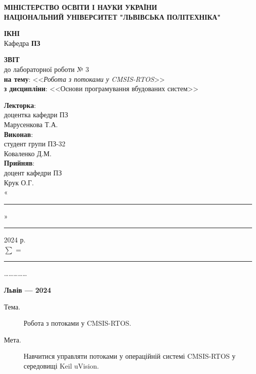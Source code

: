 \documentclass[oneside,14pt]{extarticle}
\newcommand\subject{Основи програмування вбудованих систем}
\newcommand\lecturer{доцентка кафедри ПЗ\\Марусенкова Т.А.}
\newcommand\teacher{доцент кафедри ПЗ\\Крук О.Г.}
\newcommand\mygroup{ПЗ-32}
\newcommand\lab{3}
\newcommand\theme{Робота з потоками у CMSIS-RTOS}
\newcommand\purpose{Навчитися управляти потоками у операційній системі CMSIS-RTOS у середовищі Keil uVision}
\begin{document}
\begin{normalsize}
	\begin{titlepage}
		\thispagestyle{empty}
		\begin{center}
			\textbf{МІНІСТЕРСТВО ОСВІТИ І НАУКИ УКРАЇНИ\\
				НАЦІОНАЛЬНИЙ УНІВЕРСИТЕТ "ЛЬВІВСЬКА ПОЛІТЕХНІКА"}
		\end{center}
		\begin{flushright}
			\textbf{ІКНІ}\\
			Кафедра \textbf{ПЗ}
		\end{flushright}
		\vspace{80pt}
		\begin{center}
			\textbf{ЗВІТ}\\
			\vspace{10pt}
			до лабораторної роботи № \lab\\
			\textbf{на тему}: <<\textit{\theme}>>\\
			\textbf{з дисципліни}: <<\subject>>
		\end{center}
		\vspace{80pt}
		\begin{flushright}
			
			\textbf{Лекторка}:\\
			\lecturer\\
			\vspace{28pt}
			\textbf{Виконав}:\\
			
			студент групи \mygroup\\
			Коваленко Д.М.\\
			\vspace{28pt}
			\textbf{Прийняв}:\\
			
			\teacher\\
			
			\vspace{28pt}
			«\rule{1cm}{0.15mm}» \rule{1.5cm}{0.15mm} 2024 р.\\
			$\sum$ = \rule{1cm}{0.15mm}……………\\
			
		\end{flushright}
		\vspace{\fill}
		\begin{center}
			\textbf{Львів — 2024}
		\end{center}
	\end{titlepage}
		
	\begin{description}
		\item[Тема.] \theme.
		\item[Мета.] \purpose.
	\end{description}


\end{normalsize}
\end{document}
